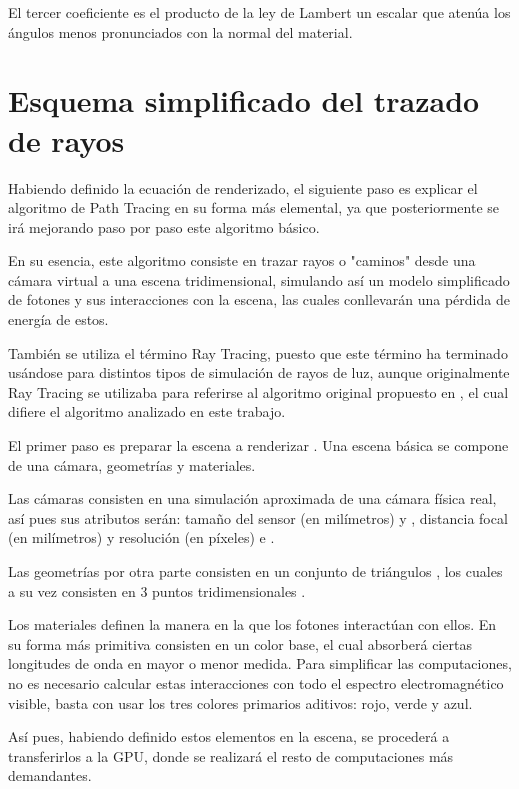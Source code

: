 El tercer coeficiente es el producto de la ley de Lambert un escalar que atenúa los ángulos menos pronunciados con la normal del material.


	\section{Esquema simplificado del trazado de rayos}
	
Habiendo definido la ecuación de renderizado, el siguiente paso es explicar el algoritmo de Path Tracing en su forma más elemental, ya que posteriormente se irá mejorando paso por paso este algoritmo básico.

En su esencia, este algoritmo consiste en trazar rayos o "caminos" desde una cámara virtual a una escena tridimensional, simulando así un modelo simplificado de fotones y sus interacciones con la escena, las cuales conllevarán una pérdida de energía de estos.


También se utiliza el término Ray Tracing, puesto que este término ha terminado usándose para distintos tipos de simulación de rayos de luz, aunque originalmente Ray Tracing se utilizaba para referirse al algoritmo original propuesto en , el cual difiere el algoritmo analizado en este trabajo. 


El primer paso es preparar la escena a renderizar . Una escena básica se compone de una cámara, geometrías y materiales.

Las cámaras  consisten en una simulación aproximada de una cámara física real, así pues sus atributos serán: tamaño del sensor (en milímetros)  y , distancia focal (en milímetros)  y resolución (en píxeles)  e . 

Las geometrías  por otra parte consisten en un conjunto de triángulos , los cuales a su vez consisten en 3 puntos tridimensionales .

Los materiales  definen la manera en la que los fotones interactúan con ellos. En su forma más primitiva consisten en un color base, el cual absorberá ciertas longitudes de onda en mayor o menor medida. Para simplificar las computaciones, no es necesario calcular estas interacciones con todo el espectro electromagnético visible, basta con usar los tres colores primarios aditivos: rojo, verde y azul.


Así pues, habiendo definido estos elementos en la escena, se procederá a transferirlos a la GPU, donde se realizará el resto de computaciones más demandantes. 













	










